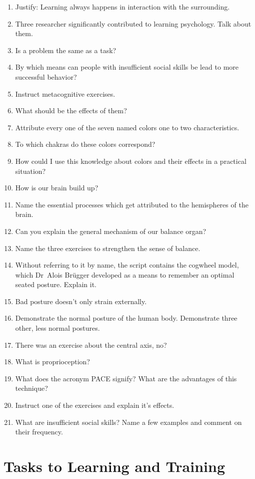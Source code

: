 \documentclass[../main.tex]{subfiles}
\begin{document}
\begin{enumerate}
\item Justify: Learning always happens in interaction with the surrounding.
\item Three researcher significantly contributed to learning psychology. Talk about them.
\item Is a problem the same as a task?
\item By which means can people with insufficient social skills be lead to more successful behavior?
\item Instruct metacognitive exercises.
\item What should be the effects of them?
\item Attribute every one of the seven named colors one to two characteristics.
\item To which chakras do these colors correspond?
\item How could I use this knowledge about colors and their effects in a practical situation?
  \item How is our brain build up?
\item Name the essential processes which get attributed to the hemispheres of the brain.
\item Can you explain the general mechanism of our balance organ?
\item Name the three exercises to strengthen the sense of balance.
\item Without referring to it by name, the script contains the cogwheel model,
  which Dr~Alois Br\"ugger developed as a means to remember an optimal seated posture. Explain it.
\item Bad posture doesn't only strain externally.
\item Demonstrate the normal posture of the human body. Demonstrate three other, less normal postures.
\item There was an exercise about the central axis, no?
\item What is proprioception?
\item What does the acronym PACE signify? What are the advantages of this technique?
\item Instruct one of the exercises and explain it's effects.
  \item What are insufficient social skills? Name a few examples and comment on their frequency. 
  \end{enumerate}

  \section{Tasks to Learning and Training}
\end{document}
